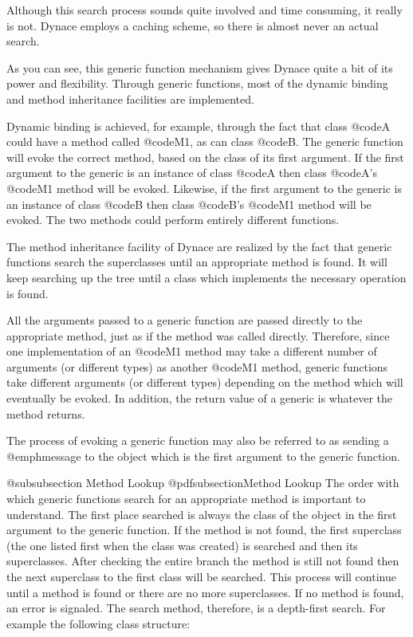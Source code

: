 Although this search process sounds quite involved and time consuming, it
really is not.  Dynace employs a caching scheme, so there is almost never
an actual search.

As you can see, this generic function mechanism gives Dynace quite a bit of
its power and flexibility.  Through generic functions, most of the
dynamic binding and method inheritance facilities are implemented.

Dynamic binding is achieved, for example, through the fact that class
@code{A} could have a method called @code{M1}, as can class @code{B}.
The generic function will evoke the correct method, based on the class
of its first argument.  If the first argument to the generic is an
instance of class @code{A} then class @code{A}'s @code{M1} method will
be evoked.  Likewise, if the first argument to the generic is an
instance of class @code{B} then class @code{B}'s @code{M1} method will
be evoked.  The two methods could perform entirely different functions.

The method inheritance facility of Dynace are realized by the fact that
generic functions search the superclasses until an appropriate
method is found.  It will keep searching up the tree until a class
which implements the necessary operation is found.

All the arguments passed to a generic function are passed directly to
the appropriate method, just as if the method was called directly.
Therefore, since one implementation of an @code{M1} method may take a
different number of arguments (or different types) as another @code{M1}
method, generic functions take different arguments (or different types)
depending on the method which will eventually be evoked.  In addition,
the return value of a generic is whatever the method returns.

The process of evoking a generic function may also be referred to as
sending a @emph{message} to the object which is the first argument to
the generic function.

@subsubsection Method Lookup
@pdfsubsection{Method Lookup}
The order with which generic functions search for an appropriate method
is important to understand.  The first place searched is always the
class of the object in the first argument to the generic function.  If
the method is not found, the first superclass (the one listed first when
the class was created) is searched and then its superclasses.  After
checking the entire branch the method is still not found then the next
superclass to the first class will be searched.  This process will
continue until a method is found or there are no more superclasses.  If
no method is found, an error is signaled.  The search method, therefore,
is a depth-first search.  For example the following class structure:

